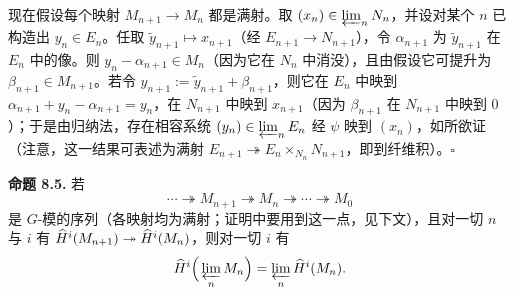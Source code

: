 现在假设每个映射 $M_{n+1}\to M_n$ 都是满射。取 $(x_n)\in\varprojlim_n N_n$，并设对某个 $n$ 已构造出 $y_n\in E_n$。任取 $\tilde y_{n+1}\mapsto x_{n+1}$（经 $E_{n+1}\to N_{n+1}$），令 $\alpha_{n+1}$ 为 $\tilde y_{n+1}$ 在 $E_n$ 中的像。则 $y_n-\alpha_{n+1}\in M_n$（因为它在 $N_n$ 中消没），且由假设它可提升为 $\beta_{n+1}\in M_{n+1}$。若令 $y_{n+1}:=\tilde y_{n+1}+\beta_{n+1}$，则它在 $E_n$ 中映到 $\alpha_{n+1}+y_n-\alpha_{n+1}=y_n$，在 $N_{n+1}$ 中映到 $x_{n+1}$（因为 $\beta_{n+1}$ 在 $N_{n+1}$ 中映到 $0$）；于是由归纳法，存在相容系统 $(y_n)\in\varprojlim_n E_n$ 经 $\psi$ 映到 $(x_n)$，如所欲证（注意，这一结果可表述为满射 $E_{n+1}\twoheadrightarrow E_n\times_{N_n}N_{n+1}$，即到纤维积）。\hfill$\square$

\textbf{命题 8.5.} 若
\begin{equation}\tag{8.4}
\cdots\twoheadrightarrow M_{n+1}\twoheadrightarrow M_n\twoheadrightarrow\cdots\twoheadrightarrow M_0
\end{equation}
是 $G$-模的序列（各映射均为满射；证明中要用到这一点，见下文），且对一切 $n$ 与 $i$ 有 $\widehat{H}^i(M_{n+1})\twoheadrightarrow\widehat{H}^i(M_n)$，则对一切 $i$ 有
\[
\widehat{H}^i\Big(\varprojlim_n M_n\Big)=\varprojlim_n\widehat{H}^i(M_n).
\]

